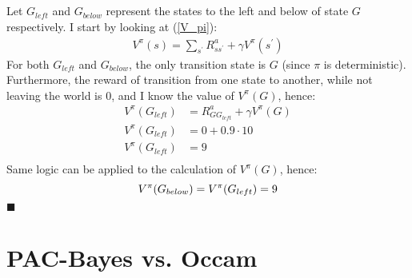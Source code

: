\documentclass[a4paper]{article}
\newcommand*{\QEDA}{\hfill\ensuremath{\blacksquare}}%
\begin{document}
\subsection{}
\label{subsec:21}
Let $G_{left}$ and $G_{below}$ represent the states to the left and below of
state $G$ respectively. I start by looking at (\ref{V_pi}):
\begin{align*}
  V^{\pi}(s) = \sum_{s^{\prime}} R_{s s^{\prime}}^{a}+\gamma V^{\pi}\left(s^{\prime}\right)
\end{align*}
For both $G_{left}$ and $G_{below}$, the only transition state is $G$ (since
$\pi$ is deterministic). Furthermore, the reward of transition from one state to
another, while not leaving the world is 0, and I know the value of $V^{\pi}(G)$, hence:
\begin{align*}
  V^{\pi}(G_{left}) &= R_{G G_{left}}^{a}+\gamma V^{\pi}(G) \\
  V^{\pi}(G_{left}) &= 0+0.9 \cdot 10 \\
  V^{\pi}(G_{left}) &= 9 \\
\end{align*}
Same logic can be applied to the calculation of $V^{\pi}(G)$, hence:
\[
  V^{\pi}(G_{below}) = V^{\pi}(G_{left}) = 9 \\
\]
\QEDA
\newpage

\section{PAC-Bayes vs. Occam}
\label{sec:3}
\end{document}
